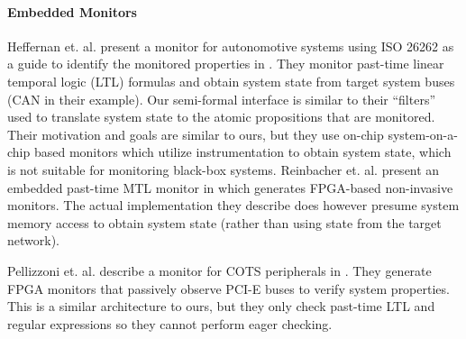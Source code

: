 \paragraph{Embedded Monitors}
Heffernan et. al. present a monitor for autonomotive systems using ISO 26262 as a guide to identify the monitored properties in \cite{Heffernan2014}. They monitor past-time linear temporal logic (LTL) formulas and obtain system state from target system buses (CAN in their example). Our semi-formal interface is similar to their ``filters'' used to translate system state to the atomic propositions that are monitored. Their motivation and goals are similar to ours, but they use on-chip system-on-a-chip based monitors which utilize instrumentation to obtain system state, which is not suitable for monitoring black-box systems.
Reinbacher et. al. present an embedded past-time MTL monitor in \cite{Reinbacher2013} which generates FPGA-based non-invasive monitors. 
The actual implementation they describe does however presume system memory access to obtain system state (rather than using state from the target network).

Pellizzoni et. al. describe a monitor for COTS peripherals in \cite{Pellizzoni2008}. They generate FPGA monitors that passively observe PCI-E buses to verify system properties. This is a similar architecture to ours, but they only check past-time LTL and regular expressions so they cannot perform eager checking.
